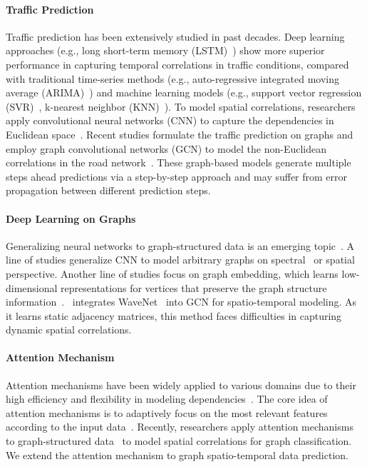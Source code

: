 \documentclass[letterpaper]{article} \usepackage{aaai20}  \usepackage{times}  \usepackage{helvet} \usepackage{courier}  \usepackage[hyphens]{url}  \usepackage{graphicx} \usepackage{amsmath}
\begin{document}
\paragraph{Traffic Prediction} Traffic prediction has been extensively studied in past decades. Deep learning approaches (e.g., long short-term memory (LSTM)~\cite{Ma-et-al:TRC2015}) show more superior performance in capturing temporal correlations in traffic conditions, compared with traditional time-series methods (e.g., auto-regressive integrated moving average (ARIMA)~\cite{ARIMA:1997}) and machine learning models (e.g., support vector regression (SVR)~\cite{Wu-et-al:TITS2004}, k-nearest neighbor (KNN)~\cite{Zheng-et-al:TRC2014}). To model spatial correlations, researchers apply convolutional neural networks (CNN) to capture the dependencies in Euclidean space~\cite{Zhang-et-al:AAAI2017,Yao-et-al:AAAI2018,Yao-et-al:AAAI2019}. Recent studies formulate the traffic prediction on graphs and employ graph convolutional networks (GCN) to model the non-Euclidean correlations in the road network~\cite{Li-et-al:ICLR2018,Lv-et-al:IJCAI2018}. These graph-based models generate multiple steps ahead predictions via a step-by-step approach and may suffer from error propagation between different prediction steps.

\paragraph{Deep Learning on Graphs} Generalizing neural networks to graph-structured data is an emerging topic~\cite{Bronstein-et-al:SPM2017,Wu-et-al:arXiv2019}. A line of studies generalize CNN to model arbitrary graphs on spectral~\cite{Defferrard-et-al:NIPS2016,Kipf-and-Welling:ICLR2017,Li-et-al:AAAI2018} or spatial~\cite{Atwood-and-Towsley:NIPS2016,Hamilton-et-al:NIPS2017,Chen-et-al:ICLR2018} perspective. Another line of studies focus on graph embedding, which learns low-dimensional representations for vertices that preserve the graph structure information~\cite{Grover-and-Leskovec:KDD2016,Cui-et-al:TKDE2019}.~\cite{Wu-et-al:IJCAI2019} integrates WaveNet~\cite{Oord-et-al:arXiv2016} into GCN for spatio-temporal modeling. As it learns static adjacency matrices, this method faces difficulties in capturing dynamic spatial correlations.

\paragraph{Attention Mechanism} Attention mechanisms have been widely applied to various domains due to their high efficiency and flexibility in modeling dependencies~\cite{Vaswani-et-al:NIPS2017,Shen-et-al:AAAI2018,Du-et-al:arXiv2018}. The core idea of attention mechanisms is to adaptively focus on the most relevant features according to the input data~\cite{Cheng-et-al:AAAI2018}. Recently, researchers apply attention mechanisms to graph-structured data~\cite{Velickovic-et-al:ICLR2018} to model spatial correlations for graph classification. We extend the attention mechanism to graph spatio-temporal data prediction.
\end{document}
